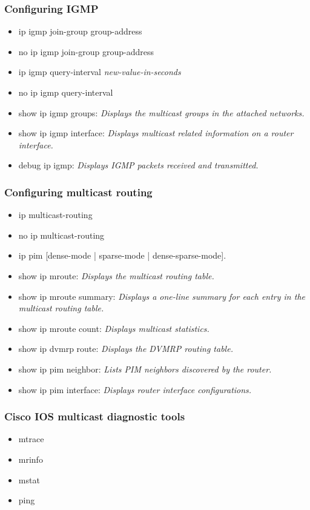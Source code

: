 \documentclass{../UTNetLab}
\begin{document}
\subsubsection{Configuring IGMP}
\begin{itemize}
    \item ip igmp join-group group-address
    \item no ip igmp join-group group-address
    \item ip igmp query-interval \textit{new-value-in-seconds}
    \item no ip igmp query-interval
    \item show ip igmp groups: \textit{Displays the multicast groups in the attached
    networks.}
    \item show ip igmp interface: \textit{Displays multicast related information on a
    router interface.}
    \item debug ip igmp: \textit{Displays IGMP packets received and transmitted.}
\end{itemize}

\subsubsection{Configuring multicast routing}
\begin{itemize}
    \item ip multicast-routing
    \item no ip multicast-routing
    \item ip pim [dense-mode | sparse-mode | dense-sparse-mode].
    \item show ip mroute: \textit{Displays the multicast routing table.}
    \item show ip mroute summary: \textit{Displays a one-line summary for each entry in the multicast routing table.}
    \item show ip mroute count: \textit{Displays multicast statistics.}
    \item show ip dvmrp route: \textit{Displays the DVMRP routing table.}
    \item show ip pim neighbor: \textit{Lists PIM neighbors discovered by the router.}
    \item show ip pim interface: \textit{Displays router interface configurations.}
\end{itemize}

\subsubsection{Cisco IOS multicast diagnostic tools}
\begin{itemize}
    \item mtrace
    \item mrinfo
    \item mstat
    \item ping
\end{itemize}
\end{document}
